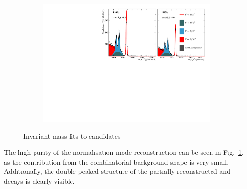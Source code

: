 \begin{figure}[!h]
    \centering
    \begin{subfigure}[t]{1.0\textwidth}
        \includegraphics[width=1.0\textwidth]{figs/Appendix_FitCategories/canvas_DsD0_merged_both_summed_splitHel_splitKKPi_s21_s21r1_s24_s26.pdf}
    \end{subfigure}
    \caption{Invariant mass fits to \decay{\Bp}{\Dsp\Dzb} candidates}
    \label{fig:B2DsPhi_Norm_Fit}
\end{figure}

The high purity of the normalisation mode reconstruction can be seen in Fig.~\ref{fig:B2DsPhi_Norm_Fit}, as the contribution from the combinatorial background shape is very small. Additionally, the double-peaked structure of the partially reconstructed \decay{\Bp}{\Dssp\Dzb} and \decay{\Bp}{\Dsp\Dstarzb} decays is clearly visible. 


